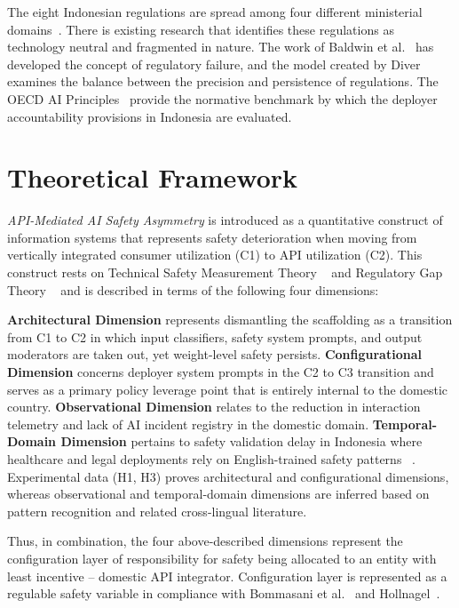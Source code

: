﻿\documentclass[conference]{IEEEtran}
\begin{document}
The eight Indonesian regulations are spread among four different ministerial domains~\cite{b9,b10,b11,b12,b13,b14,b15,b16}. There is existing research that identifies these regulations as technology neutral and fragmented in nature. The work of Baldwin et al.~\cite{b2} has developed the concept of regulatory failure, and the model created by Diver ~\cite{b8} examines the balance between the precision and persistence of regulations. The OECD AI Principles~\cite{b35} provide the normative benchmark by which the deployer accountability provisions in Indonesia are evaluated.

\section{Theoretical Framework}

\textit{API-Mediated AI Safety Asymmetry} is introduced as a quantitative construct of information systems that represents safety deterioration when moving from vertically integrated consumer utilization (C1) to API utilization (C2). This construct rests on Technical Safety Measurement Theory ~\cite{b1,b3} and Regulatory Gap Theory ~\cite{b2,b8} and is described in terms of the following four dimensions:

\textbf{Architectural Dimension} represents dismantling the scaffolding as a transition from C1 to C2 in which input classifiers, safety system prompts, and output moderators are taken out, yet weight-level safety persists. \textbf{Configurational Dimension} concerns deployer system prompts in the C2 to C3 transition and serves as a primary policy leverage point that is entirely internal to the domestic country. \textbf{Observational Dimension} relates to the reduction in interaction telemetry and lack of AI incident registry in the domestic domain. \textbf{Temporal-Domain Dimension} pertains to safety validation delay in Indonesia where healthcare and legal deployments rely on English-trained safety patterns ~\cite{b5}. Experimental data (H1, H3) proves architectural and configurational dimensions, whereas observational and temporal-domain dimensions are inferred based on pattern recognition and related cross-lingual literature.

Thus, in combination, the four above-described dimensions represent the configuration layer of responsibility for safety being allocated to an entity with least incentive – domestic API integrator. Configuration layer is represented as a regulable safety variable in compliance with Bommasani et al.~\cite{b24} and Hollnagel~\cite{b7}.
\end{document}
